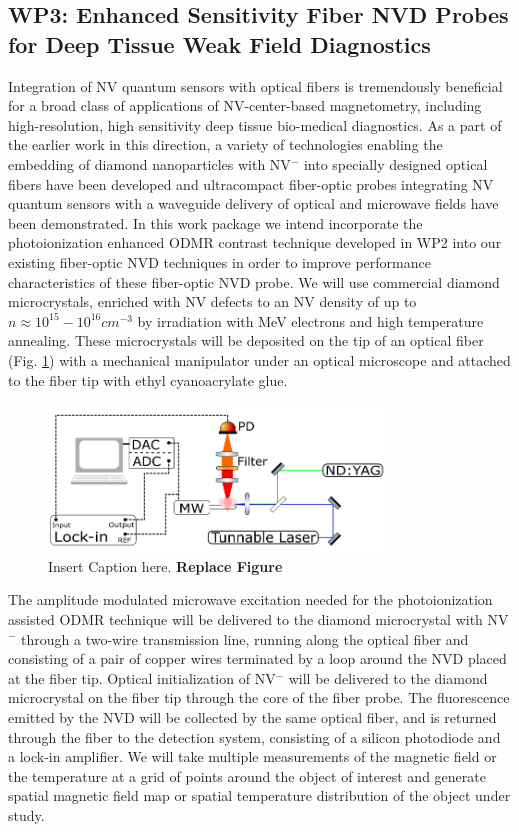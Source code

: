 \subsection{WP3: Enhanced Sensitivity Fiber NVD Probes for Deep Tissue Weak Field Diagnostics}
Integration of NV quantum sensors with optical fibers is tremendously beneficial for a broad class of
applications of NV-center-based magnetometry, including high-resolution, high sensitivity deep tissue
bio-medical diagnostics. As a part of the earlier work in this direction, a variety of technologies
enabling the embedding of diamond nanoparticles with NV$^-$ into specially designed optical fibers
have been developed and ultracompact fiber-optic probes integrating NV quantum sensors with a waveguide
delivery of optical and microwave fields have been demonstrated. In this work package we intend
incorporate the photoionization enhanced ODMR contrast technique developed in WP2 into our existing
fiber-optic NVD techniques in order to improve performance characteristics of these fiber-optic NVD
probe. We will use commercial diamond microcrystals, enriched with NV defects to an NV density of up to
$n \approx 10^{15}-10^{16}\unit{cm^{-3}}$ by irradiation with MeV electrons and high temperature annealing. 
These microcrystals will be deposited on the tip of an optical fiber (Fig. \ref{WP3Schematic}) with a mechanical 
manipulator under an optical microscope and attached to the fiber tip with ethyl cyanoacrylate glue.

\begin{figure}
\centering
\includegraphics[width=0.8\textwidth]{Figures/WP2Schematic.png}
\caption{Insert Caption here. \textbf{Replace Figure}}
\label{WP3Schematic}
\end{figure}

The amplitude modulated microwave excitation needed for the photoionization assisted ODMR technique will be 
delivered to the diamond microcrystal with NV$^-$ through a two-wire transmission line, running along the 
optical fiber and consisting of a pair of copper wires terminated by a loop around the NVD placed at the fiber 
tip.  Optical initialization of NV$^-$ will be delivered to the diamond microcrystal on the fiber tip through 
the core of the fiber probe. The fluorescence emitted by the NVD will be collected by the same optical fiber, 
and is returned through the fiber to the detection system, consisting of a silicon photodiode and a lock-in 
amplifier.  We will take multiple measurements of the magnetic field or the temperature at a grid of points 
around the object of interest and generate spatial magnetic field map or spatial temperature distribution of the 
object under study. 

